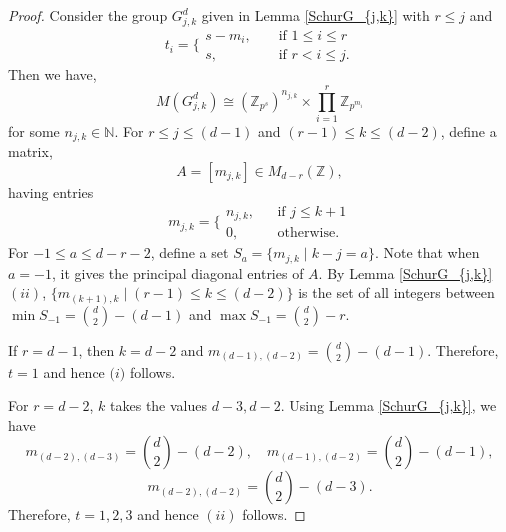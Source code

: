 \documentclass[preprint,sort&compress,12pt]{elsarticle}
\numberwithin{equation}{section}
\theoremstyle{definition}
\newcommand{\Z}{\mathbb{Z}}
\newcommand{\sabnam}[1]{{\color{red} #1}}
\begin{document}
\begin{proof}
  Consider the group $G_{j,k}^d$ given in Lemma \ref{SchurG_{j,k}} with $r \le j$ and
 \[t_i=\biggl\{ 
\begin{array}{lcl}
s-m_i, && \text{ if } 1 \le i \le r\\
s, && \text{ if }r<i\le j.
	     \end{array}
\]
 Then we have,
$$M(G_{j,k}^d) \cong (\Z_{p^s})^{n_{j,k}} \times\prod_{i=1}^{r}\Z_{p^{m_i}} $$
for some $n_{j,k} \in \mathbb{N}$.  
 For $r \le j \le (d-1)$ and $(r-1) \le k \le (d-2)$, define a matrix,
 $$A=[m_{j,k}] \in M_{d-r}(\mathbb Z),$$
having entries
\[ m_{j,k}=\biggl\{ 
\begin{array}{lcl}
n_{j,k}, && \text{if } j \leq k+1\\
0, && \text{otherwise}.
	     \end{array}
\]
For $-1 \leq a \leq d-r-2$,   define a set ${S_a=\{m_{j,k}\mid k-j=a\}}$. %
  Note that when $a=-1$, it gives the principal diagonal entries of $A$. By Lemma \ref{SchurG_{j,k}}$(ii)$, ${\{m_{(k+1),k} \mid (r-1) \le k \le (d-2)\}}$ is the set of all integers between ${\min S_{-1}=\binom{d}{2}-(d-1)}$ and $\max S_{-1}={\binom{d}{2}-r}$. 
  
If $r=d-1$, then $k=d-2$ and $m_{(d-1),(d-2)}=\binom{d}{2}-(d-1)$. Therefore,
$t=1$ and hence $\textit{(i)}$ follows.

For $r=d-2$, $k$ takes the values $d-3,d-2$. Using Lemma \ref{SchurG_{j,k}}, we have 
$$m_{(d-2),(d-3)}=\binom{d}{2}-(d-2),\quad m_{(d-1),(d-2)}=\binom{d}{2}-(d-1),$$
$$m_{(d-2),(d-2)}=\binom{d}{2}-(d-3).$$
Therefore, $t=1,2,3$ and hence $(ii)$ follows.


\end{proof}
\end{document}
